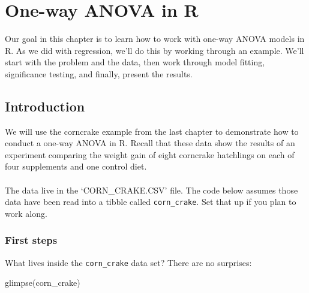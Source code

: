 \documentclass[
]{book}
\newenvironment{Shaded}{\begin{snugshade}}{\end{snugshade}}
\newcommand{\FunctionTok}[1]{\textcolor[rgb]{0.00,0.00,0.00}{#1}}
\newcommand{\NormalTok}[1]{#1}
\newenvironment{greybox}{
  \definecolor{shadecolor}{rgb}{0.95,0.95,0.95}  %
  \color{black}
  \begin{shaded}}
 {\end{shaded}}
\newenvironment{infobox}[1]
  {
  \begin{itemize}
  \renewcommand{\labelitemi}{
    \raisebox{-.7\height}[0pt][0pt]{
      {\setkeys{Gin}{width=3em,keepaspectratio}
        \texttt{[image: images/\#1]}}
    }
  }
  \setlength{\fboxsep}{1em}
  \begin{greybox}
  \item
  }
  {
  \end{greybox}
  \end{itemize}
  }
\begin{document}
\hypertarget{one-way-anova-in-R}{%
\chapter{One-way ANOVA in R}\label{one-way-anova-in-R}}

Our goal in this chapter is to learn how to work with one-way ANOVA models in R. As we did with regression, we'll do this by working through an example. We'll start with the problem and the data, then work through model fitting, significance testing, and finally, present the results.

\hypertarget{introduction-3}{%
\section{Introduction}\label{introduction-3}}

We will use the corncrake example from the last chapter to demonstrate how to conduct a one-way ANOVA in R. Recall that these data show the results of an experiment comparing the weight gain of eight corncrake hatchlings on each of four supplements and one control diet.

\begin{infobox}{action}

\hypertarget{section-8}{%
\subsubsection*{}\label{section-8}}

The data live in the `CORN\_CRAKE.CSV' file. The code below assumes those data have been read into a tibble called \texttt{corn\_crake}. Set that up if you plan to work along.

\end{infobox}

\hypertarget{first-steps-1}{%
\subsection{First steps}\label{first-steps-1}}

What lives inside the \texttt{corn\_crake} data set? There are no surprises:

\begin{Shaded}
\begin{Highlighting}[]
\FunctionTok{glimpse}\NormalTok{(corn\_crake)}
\end{Highlighting}
\end{Shaded}
\end{document}
